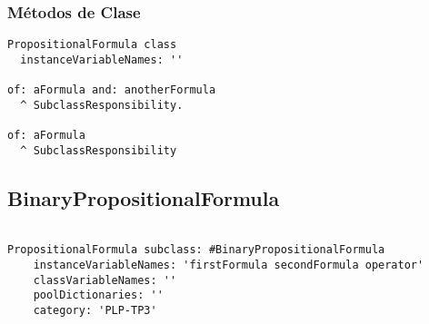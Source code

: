 \documentclass[spanish, 10pt,a4paper]{article}
\numberwithin{equation}{section} %
\begin{document}
\subsubsection{Métodos de Clase}
\begin{lstlisting}
PropositionalFormula class
  instanceVariableNames: ''

of: aFormula and: anotherFormula
  ^ SubclassResponsibility.

of: aFormula
  ^ SubclassResponsibility 

\end{lstlisting}

\subsection{BinaryPropositionalFormula}

\begin{lstlisting}

PropositionalFormula subclass: #BinaryPropositionalFormula
	instanceVariableNames: 'firstFormula secondFormula operator'
	classVariableNames: ''
	poolDictionaries: ''
	category: 'PLP-TP3'

\end{lstlisting}
\end{document}
